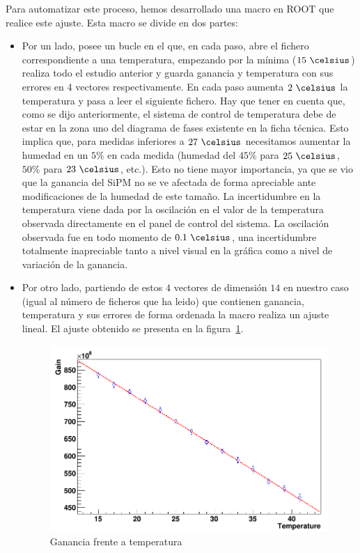 Para automatizar este proceso, hemos desarrollado una macro en ROOT que realice este ajuste. Esta macro se divide en dos partes:
\begin{itemize}
\item{} Por un lado,  posee un bucle en el que, en cada paso, abre el fichero correspondiente a una temperatura, empezando por la mínima ($15~\celsius$) realiza todo el estudio anterior y guarda ganancia y temperatura con sus errores en 4 vectores respectivamente. En cada paso aumenta $2~\celsius$ la temperatura y pasa a leer el siguiente fichero.
Hay que tener en cuenta que, como se dijo anteriormente, el sistema de control de temperatura debe de estar en la zona uno del diagrama de fases existente en la ficha técnica. Esto implica que, para medidas inferiores a $27~\celsius$ necesitamos aumentar la humedad en un $5\%$ en cada medida (humedad del $45\%$ para $25~\celsius$, $50\%$ para $23~\celsius$, etc.). Esto no tiene mayor importancia, ya que se vio que la ganancia del SiPM no se ve afectada de forma apreciable ante modificaciones de la humedad de este tamaño.
La incertidumbre en la temperatura viene dada por la oscilación en el valor de la temperatura observada directamente en el panel de control del sistema. La oscilación observada fue en todo momento de $0.1~\celsius$, una incertidumbre totalmente inapreciable tanto a nivel visual en la gráfica como a nivel de variación de la ganancia.

\item {} Por otro lado, partiendo de estos $4$ vectores de dimensión $14$ en nuestro caso (igual al número de ficheros que ha leido) que contienen ganancia, temperatura y sus errores de forma ordenada la macro realiza un ajuste lineal. El ajuste obtenido se presenta en la figura~\ref{temperatura}.

\begin{figure}[hbtp]
\centering
\includegraphics[scale=0.4]{Dependenciatemperatura.png}
\caption{ Ganancia frente a temperatura\label{temperatura}}
\end{figure}


\end{itemize}
